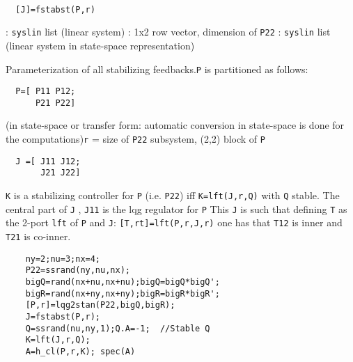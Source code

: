 \begin{mandesc}
   \\ %
\end{mandesc}
\begin{calling_sequence}
\begin{verbatim}
  [J]=fstabst(P,r)  
\end{verbatim}
\end{calling_sequence}
\begin{parameters}
  \begin{varlist}
    : \verb!syslin! list (linear system)
    : 1x2 row vector, dimension of \verb!P22!
    : \verb!syslin! list (linear system in state-space representation)
  \end{varlist}
\end{parameters}
\begin{mandescription}
  Parameterization of all stabilizing feedbacks.\verb!P! is partitioned as follows:
\begin{verbatim}
  P=[ P11 P12;
      P21 P22]  
\end{verbatim}
(in state-space or transfer form: automatic conversion in state-space is
done for the computations)\verb!r! = size of  \verb!P22! subsystem, (2,2) block of \verb!P!
\begin{verbatim}
  J =[ J11 J12;
       J21 J22]
\end{verbatim}
\verb!K! is a stabilizing controller for \verb!P! (i.e. \verb!P22!) iff 
\verb!K=lft(J,r,Q)! with \verb!Q! stable.
The central part of \verb!J! , \verb!J11! is the lqg regulator for \verb!P!
This \verb!J! is such that defining \verb!T! as the 2-port \verb!lft! of \verb!P!
and \verb!J!: \verb![T,rt]=lft(P,r,J,r)! one has that \verb!T12! is inner
and \verb!T21! is co-inner.
\end{mandescription}
\begin{examples}
  \begin{Verbatim}
    ny=2;nu=3;nx=4;
    P22=ssrand(ny,nu,nx);
    bigQ=rand(nx+nu,nx+nu);bigQ=bigQ*bigQ';
    bigR=rand(nx+ny,nx+ny);bigR=bigR*bigR';
    [P,r]=lqg2stan(P22,bigQ,bigR);
    J=fstabst(P,r);
    Q=ssrand(nu,ny,1);Q.A=-1;  //Stable Q
    K=lft(J,r,Q);
    A=h_cl(P,r,K); spec(A)
  \end{Verbatim}
\end{examples}
\begin{manseealso}
       
\end{manseealso}
